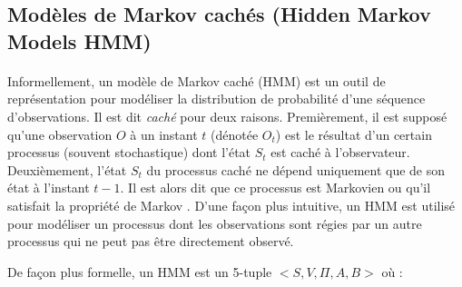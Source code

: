 \subsection{Modèles de Markov cachés (Hidden Markov Models HMM)}
\paragraph{}
Informellement, un modèle de Markov caché (HMM) est un outil de représentation pour modéliser la distribution de probabilité d'une séquence d'observations. Il est dit \textit{caché} pour deux raisons. Premièrement, il est supposé qu'une observation $O$ à un instant $t$ (dénotée $O_t$)  est le résultat d'un certain processus (souvent stochastique) dont l'état $S_t$ est caché à l'observateur. Deuxièmement, l'état $S_t$ du processus caché ne dépend uniquement que de son état à l'instant $t-1$. Il est alors dit que ce processus est Markovien ou qu'il satisfait la propriété de Markov \citep{hmm_intro,markov_process}. D'une façon plus intuitive, un HMM  est utilisé pour modéliser un processus dont les observations sont régies par un autre processus qui ne peut pas être directement observé.
\par De façon plus formelle, un HMM est un 5-tuple $<S,V,\Pi,A,B>$ \citep{hmm_formal} où :
